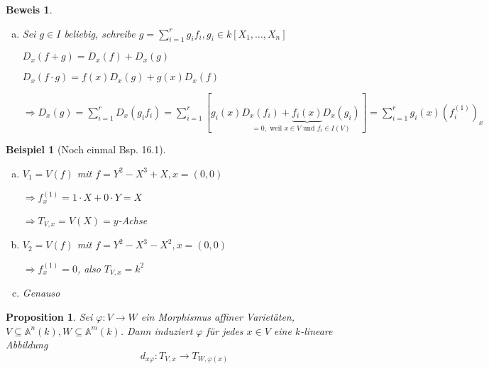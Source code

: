 \documentclass[a4paper, 12pt, numbers=noendperiod, chapterprefix=true]{scrbook}
\theoremstyle{break}
\newtheorem{Prop}[Def]{Proposition}
\theoremstyle{nonumberbreak}
\newtheorem{nnBsp}{Beispiel}
\newtheorem{Bew}{Beweis}
\theoremstyle{nonumberplain}
\newcommand{\Sum}{\sum\limits}
\newcommand{\A}{\mathbb{A}}
\begin{document}
\begin{Bew}\begin{enumerate}[a)]\item[c)]
Sei $g\in I$ beliebig, schreibe $g=\Sum_{i=1}^r g_if_i, g_i\in k[X_1,\ldots ,X_n]$

$D_x(f+g)=D_x(f)+D_x(g)$

$D_x(f\cdot g)=f(x)D_x(g)+g(x)D_x(f)$

$\Rightarrow D_x(g)=\Sum_{i=1}^rD_x(g_if_i)=\Sum_{i=1}^r[g_i(x)\underset{=0, \text{ weil }x\in V \text{ und } f_i\in I(V)}{D_x(f_i)+\underbrace{f_i(x)}D_x(g_i)}] = \Sum_{i=1}^rg_i(x)(f_i^{(1)})_x$
\end{enumerate}\end{Bew}

\begin{nnBsp}[Noch einmal Bsp. 16.1]\begin{enumerate}[a)]
\item
	$V_1=V(f)$ mit $f=Y^2-X^3+X, x=(0,0)$
	
	$\Rightarrow f_x^{(1)}=1\cdot X+0\cdot Y=X$
	
	$\Rightarrow T_{V,x}=V(X)= y$-Achse
\item
	$V_2=V(f)$ mit $f=Y^2-X^3-X^2, x=(0,0)$
	
	$\Rightarrow f_x^{(1)}=0$, also $T_{V,x}=k^2$
\item
	Genauso
\end{enumerate}\end{nnBsp}

\begin{Prop}
Sei $\varphi:V\to W$ ein Morphismus affiner Variet\"aten, $V\subseteq \A^n(k), W\subseteq \A^m(k)$. Dann induziert $\varphi$ f\"ur jedes $x\in V$ eine $k$-lineare Abbildung
	\[ d_{x\varphi}: T_{V,x}\to T_{W,\varphi(x)} \]
\end{Prop}
\end{document}
